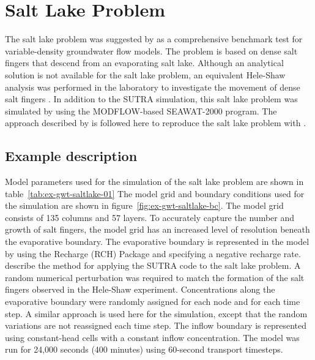 \section{Salt Lake Problem}

The salt lake problem was suggested by \cite{simmons1999} as a comprehensive benchmark test for variable-density groundwater flow models. The problem is based on dense salt fingers that descend from an evaporating salt lake. Although an analytical solution is not available for the salt lake problem, an equivalent Hele-Shaw analysis was performed in the laboratory to investigate the movement of dense salt fingers \citep{wooding1997a, wooding1997b}. In addition to the SUTRA simulation, this salt lake problem was simulated by \cite{langevin2003seawat} using the MODFLOW-based SEAWAT-2000 program.  The approach described by   \cite{langevin2003seawat} is followed here to reproduce the salt lake problem with \mf.

\subsection{Example description}

Model parameters used for the \mf simulation of the salt lake problem are shown in table~\ref{tab:ex-gwt-saltlake-01} The model grid and boundary conditions used for the \mf simulation are shown in figure~\ref{fig:ex-gwt-saltlake-bc}. The model grid consists of 135 columns and 57 layers. To accurately capture the number and growth of salt fingers, the model grid has an increased level of resolution beneath the evaporative boundary.  The evaporative boundary is represented in the model by using the Recharge (RCH) Package and specifying a negative recharge rate.  \cite{simmons1999} describe the method for applying the SUTRA code to the salt lake problem. A random numerical perturbation was required to match the formation of the salt fingers observed in the Hele-Shaw experiment. Concentrations along the evaporative boundary were randomly assigned for each node and for each time step.  A similar approach is used here for the \mf simulation, except that the random variations are not reassigned each time step.  The inflow boundary is represented using constant-head cells with a constant inflow concentration.  The \mf model was run for 24,000 seconds (400 minutes) using 60-second transport timesteps. 



